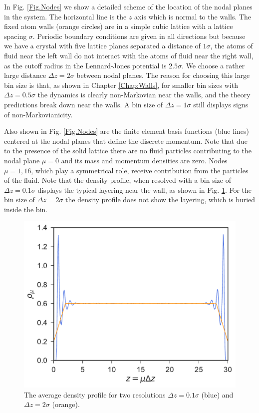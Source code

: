 \documentclass[b5paper,openright,10pt]{book}
\begin{document}
In Fig. \ref{Fig.Nodes}  we show a detailed scheme of  the location of
the nodal planes  in the system.  The horizontal line  is the $z$ axis
which is normal  to the walls. The fixed atom  walls (orange circles) are
in a  simple cubic lattice  with a lattice spacing  $\sigma$. Periodic
boundary conditions are given in all  directions but because we have a
crystal with five lattice planes separated a distance of $1\sigma$, the
atoms of fluid  near the left wall  do not interact with  the atoms of
fluid near the  right wall, as the cutoff radius  in the Lennard-Jones
potential is $2.5\sigma$.  
We  choose a
rather  large distance  $\Delta z=2\sigma$  between nodal  planes. The
reason for choosing this large bin size is that, as shown in Chapter \ref{Chap:Walls},
for  smaller bin  sizes with  $\Delta  z =0.5\sigma$  the dynamics  is
clearly non-Markovian near the walls, and the theory predictions break
down near the  walls. A bin size of $\Delta  z=1\sigma$ still displays signs
of non-Markovianicity. 

Also  shown in  Fig.   \ref{Fig.Nodes} are  the  finite element  basis
functions (blue lines) centered  at the  nodal  planes  that define  the  discrete
momentum.   Note
that  due to  the presence  of the  solid lattice  there are  no fluid
particles contributing  to the  nodal plane $\mu=0$  and its  mass and
momentum  densities   are  zero.   Nodes  $\mu=1,16$,   which  play  a
symmetrical  role,  receive  contribution  from  the  particles  of  the
fluid. Note that the density profile, when resolved with a bin size of
$\Delta z=0.1\sigma$ displays  the typical layering near  the wall, as
shown in Fig. \ref{Fig:DensityResolved}. For the bin size of $\Delta z
= 2\sigma$  the density profile does  not show the layering,  which is
buried  inside the  bin. 
\begin{figure}
  \centering
\includegraphics[scale=0.41]{Density-01sigma-2sigma}
\caption[The average density profile for two resolutions]{The average  density profile  for two resolutions  $\Delta z=
  0.1\sigma$ (blue) and  $\Delta  z=2\sigma$ (orange).}
\label{Fig:DensityResolved}
\end{figure}
\end{document}
